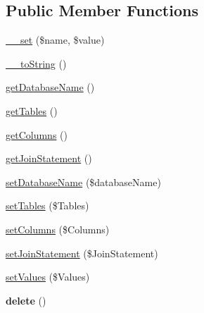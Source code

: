 \subsection*{Public Member Functions}
\begin{DoxyCompactItemize}
\item 
\hyperlink{class_able_polecat___query_language___statement___sql_abstract_a83c2703c91959192f759992ad5640b67}{\+\_\+\+\_\+set} (\$name, \$value)
\item 
\hyperlink{class_able_polecat___query_language___statement___sql_abstract_a7516ca30af0db3cdbf9a7739b48ce91d}{\+\_\+\+\_\+to\+String} ()
\item 
\hyperlink{class_able_polecat___query_language___statement___sql_abstract_a6c2092833f367c0aefa1eee1065a2e9e}{get\+Database\+Name} ()
\item 
\hyperlink{class_able_polecat___query_language___statement___sql_abstract_a61b9097ace78236a1a7f9cfd9e9ab01c}{get\+Tables} ()
\item 
\hyperlink{class_able_polecat___query_language___statement___sql_abstract_a6287262cb9628d7a89d8fc16dcb51177}{get\+Columns} ()
\item 
\hyperlink{class_able_polecat___query_language___statement___sql_abstract_a86782b4928929ab12ba40144b069dbff}{get\+Join\+Statement} ()
\item 
\hyperlink{class_able_polecat___query_language___statement___sql_abstract_a579ff19e64860fabb4de2bc0f0a6e951}{set\+Database\+Name} (\$database\+Name)
\item 
\hyperlink{class_able_polecat___query_language___statement___sql_abstract_a6482cab04363ec1ff72600908634572d}{set\+Tables} (\$Tables)
\item 
\hyperlink{class_able_polecat___query_language___statement___sql_abstract_af445359e80bf6a2cf47da855e05e4194}{set\+Columns} (\$Columns)
\item 
\hyperlink{class_able_polecat___query_language___statement___sql_abstract_a40ae268541313f589e6f2d85393a5ee8}{set\+Join\+Statement} (\$Join\+Statement)
\item 
\hyperlink{class_able_polecat___query_language___statement___sql_abstract_aa4738b204583a759c2e9a243fd3894df}{set\+Values} (\$Values)
\item 
\hypertarget{class_able_polecat___query_language___statement___sql_abstract_a13bdffdd926f26b825ea57066334ff01}{}{\bfseries delete} ()\label{class_able_polecat___query_language___statement___sql_abstract_a13bdffdd926f26b825ea57066334ff01}


\end{DoxyCompactItemize}
